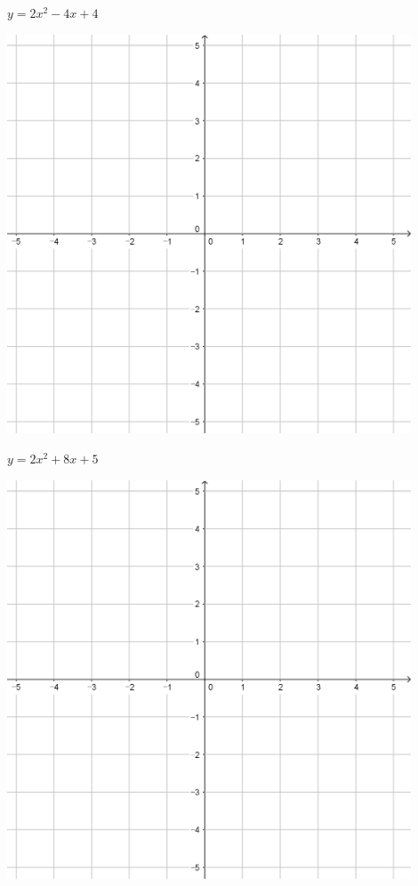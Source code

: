 \documentclass[a4paper]{oblivoir}
\begin{document}
\begin{minipage}{0.45\textwidth}\centering
\(y=2x^2-4x+4\)
\par\bigskip\includegraphics[width=0.9\textwidth]{55}
\end{minipage}
\begin{minipage}{0.45\textwidth}\centering
\(y=2x^2+8x+5\)
\par\bigskip\includegraphics[width=0.9\textwidth]{55}
\end{minipage}\bigskip\bigskip\par
\end{document}
